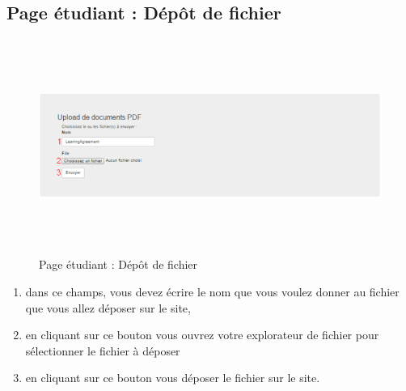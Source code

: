      
          \subsection{Page étudiant : Dépôt de fichier}
          \label{ef}
          \begin{figure}[H]
          	\centering
          	\includegraphics[width=12cm,height=7cm]{Images/Admin/ajout_fichier_admin.png}
          	\caption{Page étudiant : Dépôt de fichier}
          	
          \end{figure}
           \begin{enumerate}
           	\item dans ce champs, vous devez écrire le nom que vous voulez donner au fichier que vous allez déposer sur le site,
           	\item en cliquant sur ce bouton vous ouvrez votre explorateur de fichier pour sélectionner le fichier à déposer
           	\item en cliquant sur ce bouton vous déposer le fichier sur le site.
           \end{enumerate}
          
